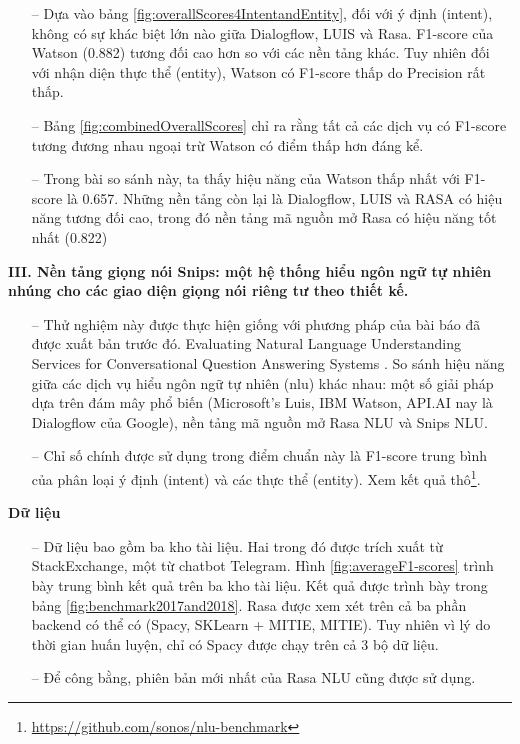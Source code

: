 \begin{itemize}
    \item[--] Dựa vào bảng \ref{fig:overallScores4IntentandEntity}, đối với ý định (intent), không có sự khác biệt lớn nào giữa Dialogflow, LUIS và Rasa. F1-score của Watson (0.882) tương đối cao hơn so với các nền tảng khác. Tuy nhiên đối với nhận diện thực thể (entity), Watson có F1-score thấp do Precision rất thấp.
    \item[--] Bảng \ref{fig:combinedOverallScores} chỉ ra rằng tất cả các dịch vụ có F1-score tương đương nhau ngoại trừ Watson có điểm thấp hơn đáng kể.
    \item[--] Trong bài so sánh này, ta thấy hiệu năng của Watson thấp nhất với F1-score là 0.657. Những nền tảng còn lại là Dialogflow, LUIS và RASA có hiệu năng tương đối cao, trong đó nền tảng mã nguồn mở Rasa có hiệu năng tốt nhất (0.822)
\end{itemize}

\textbf{III. Nền tảng giọng nói Snips: một hệ thống hiểu ngôn ngữ tự nhiên nhúng cho các giao diện giọng nói riêng tư theo thiết kế.}

\begin{itemize}
    \item[--] Thử nghiệm này được thực hiện giống với phương pháp của bài báo đã được xuất bản trước đó. Evaluating Natural Language Understanding Services for Conversational Question Answering Systems \cite{EvaluatingNLU}. So sánh hiệu năng giữa các dịch vụ hiểu ngôn ngữ tự nhiên (\ac{nlu}) khác nhau: một số giải pháp dựa trên đám mây phổ biến (Microsoft’s Luis, IBM Watson, API.AI nay là Dialogflow của Google), nền tảng mã nguồn mở Rasa NLU và Snips NLU.
    \item[--] Chỉ số chính được sử dụng trong điểm chuẩn này là F1-score trung bình của phân loại ý định (intent) và các thực thể (entity). Xem kết quả thô\footnote{\url{https://github.com/sonos/nlu-benchmark}}. 
\end{itemize}

\textbf{Dữ liệu}
\begin{itemize}
    \item[--] Dữ liệu bao gồm ba kho tài liệu. Hai trong đó được trích xuất từ StackExchange, một từ chatbot Telegram. Hình \ref{fig:averageF1-scores} trình bày trung bình kết quả trên ba kho tài liệu. Kết quả được trình bày trong bảng \ref{fig:benchmark2017and2018}. Rasa được xem xét trên cả ba phần backend có thể có (Spacy, SKLearn + MITIE, MITIE). Tuy nhiên vì lý do thời gian huấn luyện, chỉ có Spacy được chạy trên cả 3 bộ dữ liệu.
    \item[--] Để công bằng, phiên bản mới nhất của Rasa NLU cũng được sử dụng.

\end{itemize}


